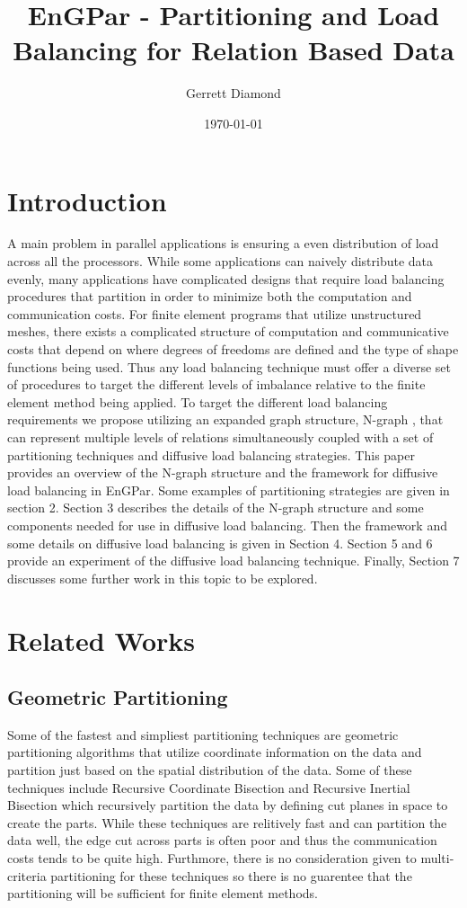 \documentclass[a4paper]{article}
\title{EnGPar - Partitioning and Load Balancing for Relation Based Data}
\author{Gerrett Diamond}
\date{\today}
\begin{document}
\maketitle

\section{Introduction}
A main problem in parallel applications is ensuring a even distribution of load across all the processors. While some applications can naively distribute data evenly, many applications have complicated designs that require load balancing procedures that partition in order to minimize both the computation and communication costs. For finite element programs that utilize unstructured meshes, there exists a complicated structure of computation and communicative costs that depend on where degrees of freedoms are defined and the type of shape functions being used. Thus any load balancing technique must offer a diverse set of procedures to target the different levels of imbalance relative to the finite element method being applied. To target the different load balancing requirements we propose utilizing an expanded graph structure, N-graph \cite{EnGPar2015proposal}, that can represent multiple levels of relations simultaneously coupled with a set of partitioning techniques and diffusive load balancing strategies.
This paper provides an overview of the N-graph structure and the framework for diffusive load balancing in EnGPar. Some examples of partitioning strategies are given in section 2. Section 3 describes the details of the N-graph structure and some components needed for use in diffusive load balancing. Then the framework and some details on diffusive load balancing is given in Section 4. Section 5 and 6 provide an experiment of the diffusive load balancing technique. Finally, Section 7 discusses some further work in this topic to be explored.

\section{Related Works}
\subsection{Geometric Partitioning}
Some of the fastest and simpliest partitioning techniques are geometric partitioning algorithms that utilize coordinate information on the data and partition just based on the spatial distribution of the data. Some of these techniques include Recursive Coordinate Bisection and Recursive Inertial Bisection \cite{chevalier2012load,TaylorRIB,williamsRIB} which recursively partition the data by defining cut planes in space to create the parts. While these techniques are relitively fast and can partition the data well, the edge cut across parts is often poor and thus the communication costs tends to be quite high. Furthmore, there is no consideration given to multi-criteria partitioning for these techniques so there is no guarentee that the partitioning will be sufficient for finite element methods.
\end{document}
